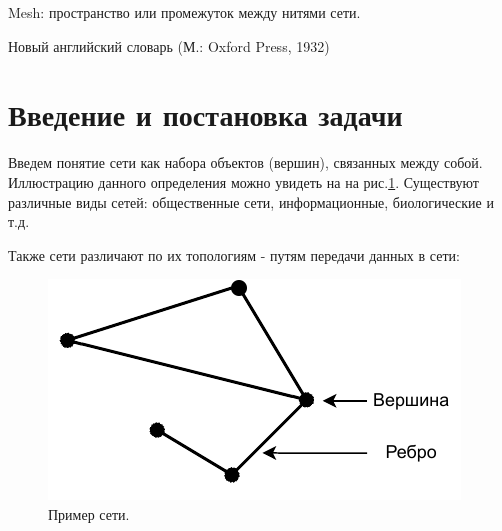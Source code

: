 \documentclass[a4paper]{article}
\begin{document}
\newcommand{\apple}{\char"F8FF}



	

\pagestyle{fancy} 
\fancyhead[C]{}
\fancyfoot[C]{ \noindent\rule{\textwidth}{0.4pt} \thepage }

\tableofcontents

\newpage

\epigraph{Mesh: пространство или промежуток между нитями сети.}{Новый английский словарь (М.: Oxford Press, 1932)}

\section{Введение и постановка задачи}
Введем понятие сети как набора объектов (вершин), связанных между собой. Иллюстрацию данного определения можно увидеть на на рис.\ref{p1}. Существуют различные виды сетей: общественные сети, информационные, биологические и т.д. \par
Также сети различают по их топологиям - путям передачи данных в сети:

\begin{figure}[H]
	\begin{center}
	\includegraphics[width=0.4\linewidth]{net.pdf}
	\caption{Пример сети.} 
    \label{p1}
    \end {center}
\end{figure}
\end{document}
